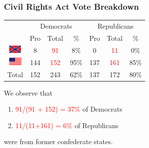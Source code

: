 \documentclass[slides]{beamer}\usepackage[]{graphicx}\usepackage[]{color}
\newcommand{\blue}[1]{\textcolor{blue2}{#1}}
\begin{document}
\begin{frame}
\frametitle{Civil Rights Act Vote Breakdown}

\begin{center}
	\begin{tabular}{c|ccc|ccc}
     & \multicolumn{3}{c|}{Democrats}  & \multicolumn{3}{c}{Republicans} \\ 
     & Pro & Total & \% & Pro & Total & \% \\ 
     \hline
     \includegraphics[height=0.4cm]{conf} & 8 & \textcolor{red}{91} & \blue{8\%} & 0 & \textcolor{red}{11} & 0\% \\ 
	 \includegraphics[height=0.4cm]{union} & 144 & \textcolor{red}{152} & \blue{95\%} & 137 & \textcolor{red}{161} & 85\% \\ 
    \hline
     Total & 152 & 243 & 62\% & 137 & 172 & \blue{80\%} \\ 
  \end{tabular}
\end{center}

We observe that 
\begin{enumerate}
\item \textcolor{red}{91/(91 + 152) = 37\%} of Democrats
\item \textcolor{red}{11/(11+161) = 6\%} of Republicans
\end{enumerate}
were from former confederate states.

\end{frame}
\end{document}
